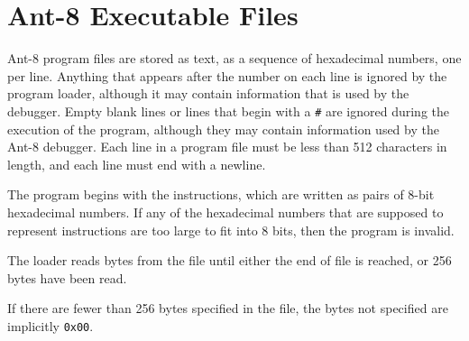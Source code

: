 \begin{description}

\item	\renewcommand{\OPCODE}{{\tt 0 0 0 0}} 
\item	\renewcommand{\OPCODE}{{\tt 0 0 0 1}} 
\item	\renewcommand{\OPCODE}{{\tt 0 0 1 0}} 
\item	\renewcommand{\OPCODE}{{\tt 0 0 1 1}} 
\item	\renewcommand{\OPCODE}{{\tt 0 1 0 0}} 
\item	\renewcommand{\OPCODE}{{\tt 0 1 0 1}} 
\item	\renewcommand{\OPCODE}{{\tt 0 1 1 0}} 
\item	\renewcommand{\OPCODE}{{\tt 0 1 1 1}} 
\item	\renewcommand{\OPCODE}{{\tt 1 0 0 0}} 
\item	\renewcommand{\OPCODE}{{\tt 1 0 0 1}} 
\item	\renewcommand{\OPCODE}{{\tt 1 0 1 0}} 
\item	\renewcommand{\OPCODE}{{\tt 1 0 1 1}} 
\item	\renewcommand{\OPCODE}{{\tt 1 1 0 0}} 
\item	\renewcommand{\OPCODE}{{\tt 1 1 0 1}} 
\item	\renewcommand{\OPCODE}{{\tt 1 1 1 0}} 
\item	\renewcommand{\OPCODE}{{\tt 1 1 1 1}} 

\end{description}

\section{{\sc Ant-8} Executable Files}
\label{executable-file-sec}

{\sc Ant-8} program files are stored as text, as a sequence of
hexadecimal numbers, one per line.  Anything that appears after the
number on each line is ignored by the program loader, although it may
contain information that is used by the debugger.  Empty blank lines
or lines that begin with a \verb$#$ are ignored during the execution
of the program, although they may contain information used by the {\sc
Ant-8} debugger.  Each line in a program file must be less than 512
characters in length, and each line must end with a newline.

The program begins with the instructions, which are written as pairs
of 8-bit hexadecimal numbers.  If any of the hexadecimal numbers that
are supposed to represent instructions are too large to fit into 8
bits, then the program is invalid.

The loader reads bytes from the file until either the end of file is
reached, or 256 bytes have been read.

If there are fewer than 256 bytes specified in the file, the bytes not
specified are implicitly {\tt 0x00}.


